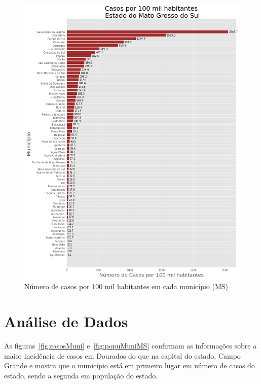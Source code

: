 \documentclass[12pt]{article}
\begin{document}
\begin{figure}[!htb]
  \centering
  \includegraphics[width=1\textwidth]{figs/casos_100_mil_por_municipio.png}
  \caption{Número de casos por 100 mil habitantes em cada município (MS)}
  \label{fig:casosMuni100k}
  \end{figure}

\section{Análise de Dados}\label{sec:dados}

As figuras~\ref{fig:casosMuni} e~\ref{fig:popuMuniMS} confirmam as informações sobre a  maior incidência de casos em Dourados do que na capital do estado, Campo Grande e mostra que o município está em primeiro lugar em número de casos do estado, sendo a segunda em população do estado.
\end{document}
